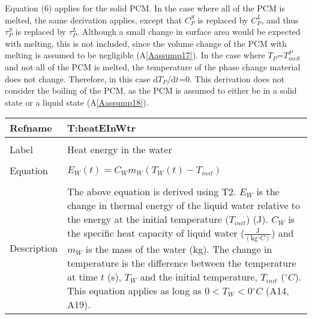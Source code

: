 \documentclass[12pt]{article}
\begin{document}
Equation (6) applies for the solid PCM. In the case where all of the PCM is melted, the same derivation applies, except that $C_{P}^{S}$ is replaced by $C_{P}^{L}$, and thus $\tau{}_{P}^{S}$ is replaced by $\tau{}_{P}^{L}$. Although a small change in surface area would be expected with melting, this is not included, since the volume change of the PCM with melting is assumed to be negligible (A\ref{Aassump17}).
In the case where $T_{P}$=$T_{melt}^{P}$ and not all of the PCM is melted, the temperature of the phase change material does not change. Therefore, in this case d$T_{P}$/d$t$=0.
This derivation does not consider the boiling of the PCM, as the PCM is assumed to either be in a solid state or a liquid state (A\ref{Aassump18}).
~\newline
\noindent \begin{minipage}{\textwidth}
\begin{tabular}{p{} p{}}
\toprule \textbf{Refname} & \textbf{T:heatEInWtr}
\label{T:heatEInWtr}
\\ \midrule \\
Label & Heat energy in the water
\\ \midrule \\
Equation & $E_{W}\left(t\right)=C_{W}m_{W}\left(T_{W}\left(t\right)-T_{init}\right)$
\\ \midrule \\
Description & The above equation is derived using T2. $E_{W}$ is the change in thermal energy of the liquid water relative to the energy at the initial temperature ($T_{init}$) (J). $C_{W}$ is the specific heat capacity of liquid water ($\frac{\text{J}}{(\text{kg}{}^{\circ}C)}$) and $m_{W}$ is the mass of the water (kg). The change in temperature is the difference between the temperature at time $t$ (s), $T_{W}$ and the initial temperature, $T_{init}$ (${}^{\circ}C$). This equation applies as long as $0<T_{W}<0$${}^{\circ}C$ (A14, A19).
\\ \bottomrule \end{tabular}
\end{minipage}\\
~\newline
\end{document}
